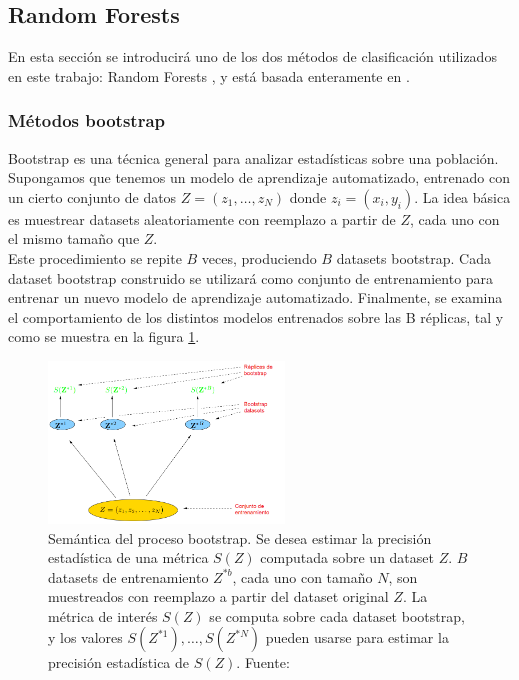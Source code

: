 \subsection{Random Forests}

En esta sección se introducirá uno de los dos métodos de clasificación utilizados en este trabajo: Random Forests \cite{rf}, y está basada enteramente en \cite{statisticallearning}.

\subsubsection{Métodos bootstrap}

Bootstrap es una técnica general para analizar estadísticas sobre una población. Supongamos que tenemos un modelo de aprendizaje automatizado, entrenado con un cierto conjunto de datos $Z=(z_1, \ldots, z_N)$ donde $z_i=(x_i,y_i)$. La idea básica es muestrear datasets aleatoriamente con reemplazo a partir de $Z$, cada uno con el mismo tamaño que $Z$. \\

Este procedimiento se repite $B$ veces, produciendo $B$ datasets bootstrap. Cada dataset bootstrap construido se utilizará como conjunto de entrenamiento para entrenar un nuevo modelo de aprendizaje automatizado. Finalmente, se examina el comportamiento de los distintos modelos entrenados sobre las B réplicas, tal y como se muestra en la figura \ref{fig:bootstrap}. \\


\begin{figure}[h!]
\begin{center}
  \includegraphics[width=0.56\textwidth]{Kap1/bootstrap.png} 
\end{center}
\caption{ Semántica del proceso bootstrap. Se desea estimar la precisión estadística de una métrica $S(Z)$ computada sobre un dataset $Z$. $B$ datasets de entrenamiento $Z^{*b}$, cada uno con tamaño $N$, son muestreados con reemplazo a partir del dataset original $Z$. La métrica de interés $S(Z)$ se computa sobre cada dataset bootstrap, y los valores $S(Z^{*1}), \ldots, S(Z^{*N})$ pueden usarse para estimar la precisión estadística de $S(Z)$.  Fuente: \protect\cite{statisticallearning} }
\label{fig:bootstrap}
\end{figure}


